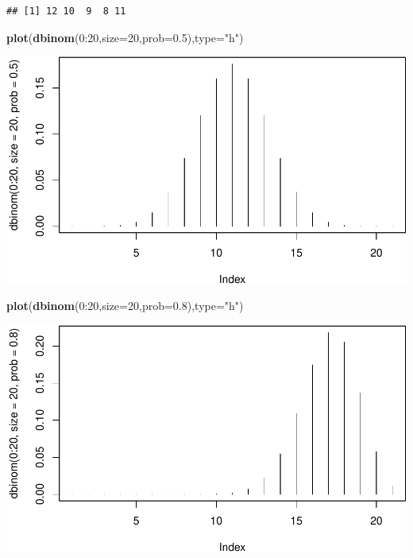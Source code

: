 \documentclass[]{article}
\newenvironment{Shaded}{\begin{snugshade}}{\end{snugshade}}
\newcommand{\KeywordTok}[1]{\textcolor[rgb]{0.13,0.29,0.53}{\textbf{{#1}}}}
\newcommand{\DataTypeTok}[1]{\textcolor[rgb]{0.13,0.29,0.53}{{#1}}}
\newcommand{\DecValTok}[1]{\textcolor[rgb]{0.00,0.00,0.81}{{#1}}}
\newcommand{\FloatTok}[1]{\textcolor[rgb]{0.00,0.00,0.81}{{#1}}}
\newcommand{\StringTok}[1]{\textcolor[rgb]{0.31,0.60,0.02}{{#1}}}
\newcommand{\NormalTok}[1]{{#1}}
\begin{document}
\begin{verbatim}
## [1] 12 10  9  8 11
\end{verbatim}

\begin{Shaded}
\begin{Highlighting}[]
\KeywordTok{plot}\NormalTok{(}\KeywordTok{dbinom}\NormalTok{(}\DecValTok{0}\NormalTok{:}\DecValTok{20}\NormalTok{,}\DataTypeTok{size=}\DecValTok{20}\NormalTok{,}\DataTypeTok{prob=}\FloatTok{0.5}\NormalTok{),}\DataTypeTok{type=}\StringTok{"h"}\NormalTok{)}
\end{Highlighting}
\end{Shaded}

\includegraphics{probability_files/figure-latex/unnamed-chunk-11-1.pdf}

\begin{Shaded}
\begin{Highlighting}[]
\KeywordTok{plot}\NormalTok{(}\KeywordTok{dbinom}\NormalTok{(}\DecValTok{0}\NormalTok{:}\DecValTok{20}\NormalTok{,}\DataTypeTok{size=}\DecValTok{20}\NormalTok{,}\DataTypeTok{prob=}\FloatTok{0.8}\NormalTok{),}\DataTypeTok{type=}\StringTok{"h"}\NormalTok{)}
\end{Highlighting}
\end{Shaded}

\includegraphics{probability_files/figure-latex/unnamed-chunk-11-2.pdf}
\end{document}
